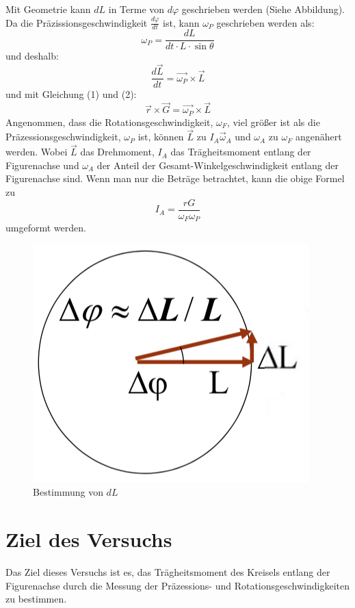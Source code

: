 \documentclass[11pt,a4paper]{article} %
\begin{document}
Mit Geometrie kann $dL$ in Terme von $d\varphi$ geschrieben werden (Siehe Abbildung). Da die Präzissionsgeschwindigkeit $\frac{d\varphi}{dt}$ ist, kann $\omega_P$ geschrieben werden als:
$$\omega_P = \frac{dL}{dt\cdot L\cdot \sin\theta}$$
und deshalb:
$$\frac{d\vec{L}}{dt} = \vec{\omega_P}\times \vec{L}$$
und mit Gleichung (1) und (2):
$$\vec{r}\times \vec{G} = \vec{\omega_P}\times \vec{L}$$
Angenommen, dass die Rotationsgeschwindigkeit, $\omega_F$, viel größer ist als die Präzessionsgeschwindigkeit, $\omega_P$ ist, können $\vec{L}$ zu $I_A\vec{\omega}_A$ und $\omega_A$ zu $\omega_F$ angenähert werden. Wobei $\vec{L}$ das Drehmoment, $I_A$ das Trägheitsmoment entlang der Figurenachse und $\omega_A$ der Anteil der Gesamt-Winkelgeschwindigkeit entlang der Figurenachse sind. Wenn man nur die Beträge betrachtet, kann die obige Formel zu 
\begin{equation}
I_A = \frac{rG}{\omega_F \omega_P}
\end{equation}
umgeformt werden.
\begin{figure}
	\centering
	\includegraphics[scale=0.5]{Abb0}
	\caption{Bestimmung von $dL$}
\end{figure}

\section{Ziel des Versuchs}
Das Ziel dieses Versuchs ist es, das Trägheitsmoment des Kreisels entlang der Figurenachse durch die Messung der Präzessions- und Rotationsgeschwindigkeiten zu bestimmen.
\end{document}
